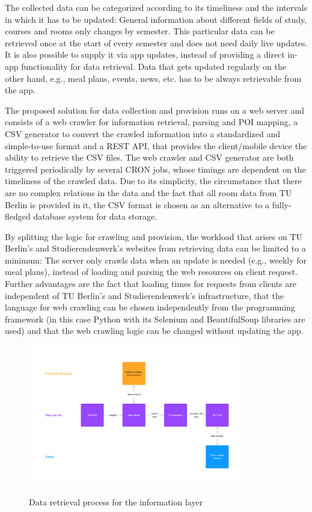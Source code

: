 The collected data can be categorized according to its timeliness and the intervals in which it has to be updated: General information about different fields of study, courses and rooms only changes by semester. This particular data can be retrieved once at the start of every semester and does not need daily live updates. It is also possible to supply it via app updates, instead of providing a direct in-app functionality for data retrieval. Data that gets updated regularly on the other hand, e.g., meal plans, events, news, etc. has to be always retrievable from the app.

The proposed solution for data collection and provision runs on a web server and consists of a web crawler for information retrieval, parsing and POI mapping, a CSV generator to convert the crawled information into a standardized and simple-to-use format and a REST API, that provides the client/mobile device the ability to retrieve the CSV files. The web crawler and CSV generator are both triggered periodically by several CRON jobs, whose timings are dependent on the timeliness of the crawled data. Due to its simplicity, the circumstance that there are no complex relations in the data and the fact that all room data from TU Berlin is provided in it, the CSV format is chosen as an alternative to a fully-fledged database system for data storage.

By splitting the logic for crawling and provision, the workload that arises on TU Berlin's and Studierendenwerk's websites from retrieving data can be limited to a minimum: The server only crawls data when an update is needed (e.g., weekly for meal plans), instead of loading and parsing the web resources on client request. Further advantages are the fact that loading times for requests from clients are independent of TU Berlin's and Studierendenwerk's infrastructure, that the language for web crawling can be chosen independently from the programming framework (in this case Python with its Selenium \cite{selenium} and BeautifulSoup \cite{beautifulsoup4} libraries are used) and that the web crawling logic can be changed without updating the app.

\begin{figure}[H]
	\centering
	\includegraphics[width=0.85\textwidth]{images/information_layer_backend.png}\\
	\caption{Data retrieval process for the information layer}
\end{figure}

